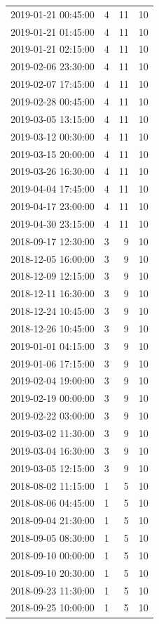 \begin{tabular}{lrrr}
2019-01-21 00:45:00 & 4 & 11 & 10 \\
2019-01-21 01:45:00 & 4 & 11 & 10 \\
2019-01-21 02:15:00 & 4 & 11 & 10 \\
2019-02-06 23:30:00 & 4 & 11 & 10 \\
2019-02-07 17:45:00 & 4 & 11 & 10 \\
2019-02-28 00:45:00 & 4 & 11 & 10 \\
2019-03-05 13:15:00 & 4 & 11 & 10 \\
2019-03-12 00:30:00 & 4 & 11 & 10 \\
2019-03-15 20:00:00 & 4 & 11 & 10 \\
2019-03-26 16:30:00 & 4 & 11 & 10 \\
2019-04-04 17:45:00 & 4 & 11 & 10 \\
2019-04-17 23:00:00 & 4 & 11 & 10 \\
2019-04-30 23:15:00 & 4 & 11 & 10 \\
2018-09-17 12:30:00 & 3 & 9 & 10 \\
2018-12-05 16:00:00 & 3 & 9 & 10 \\
2018-12-09 12:15:00 & 3 & 9 & 10 \\
2018-12-11 16:30:00 & 3 & 9 & 10 \\
2018-12-24 10:45:00 & 3 & 9 & 10 \\
2018-12-26 10:45:00 & 3 & 9 & 10 \\
2019-01-01 04:15:00 & 3 & 9 & 10 \\
2019-01-06 17:15:00 & 3 & 9 & 10 \\
2019-02-04 19:00:00 & 3 & 9 & 10 \\
2019-02-19 00:00:00 & 3 & 9 & 10 \\
2019-02-22 03:00:00 & 3 & 9 & 10 \\
2019-03-02 11:30:00 & 3 & 9 & 10 \\
2019-03-04 16:30:00 & 3 & 9 & 10 \\
2019-03-05 12:15:00 & 3 & 9 & 10 \\
2018-08-02 11:15:00 & 1 & 5 & 10 \\
2018-08-06 04:45:00 & 1 & 5 & 10 \\
2018-09-04 21:30:00 & 1 & 5 & 10 \\
2018-09-05 08:30:00 & 1 & 5 & 10 \\
2018-09-10 00:00:00 & 1 & 5 & 10 \\
2018-09-10 20:30:00 & 1 & 5 & 10 \\
2018-09-23 11:30:00 & 1 & 5 & 10 \\
2018-09-25 10:00:00 & 1 & 5 & 10 \\

\end{tabular}
